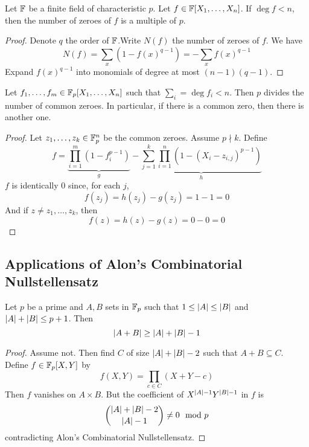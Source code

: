 \documentclass{article}
\begin{document}
\begin{nthm}
  Let $\mathbb F$ be a finite field of characteristic $p$. Let $f \in \mathbb F[X_1, \dots, X_n]$. If $\deg f < n$, then the number of zeroes of $f$ is a multiple of $p$.
\end{nthm}
\begin{proof}
  Denote $q$ the order of $\mathbb F$.Write $N(f)$ the number of zeroes of $f$. We have
  $$N(f) = \sum_x(1 - f(x)^{q - 1}) = - \sum_x f(x)^{q - 1}$$
  Expand $f(x)^{q - 1}$ into monomials of degree at most $(n - 1)(q - 1)$.
\end{proof}

\newlec

\begin{nthm}
  Let $f_1, \dots, f_m \in \mathbb F_p[X_1, \dots, X_n]$ such that $\sum_i = \deg f_i < n$. Then $p$ divides the number of common zeroes. In particular, if there is a common zero, then there is another one.
\end{nthm}
\begin{proof}
  Let $z_1, \dots, z_k \in \mathbb F_p^n$ be the common zeroes. Assume $p \nmid k$. Define
  $$f = \underbrace{\prod_{i = 1}^m (1 - f_i^{p - 1})}_g - \underbrace{\sum_{j = 1}^k \prod_{i = 1}^n (1 - (X_i - z_{i, j})^{p - 1})}_h$$
  $f$ is identically $0$ since, for each $j$,
  $$f(z_j) = h(z_j) - g(z_j) = 1 - 1 = 0$$
  And if $z \ne z_1, \dots, z_k$, then
  $$f(z) = h(z) - g(z) = 0 - 0 = 0$$
\end{proof}

\clearpage

\subsection{Applications of Alon's Combinatorial Nullstellensatz}

\begin{nthm}
  Let $p$ be a prime and $A, B$ sets in $\mathbb F_p$ such that $1 \le \left\lvert A\right\rvert \le \left\lvert B\right\rvert$ and $\left\lvert A\right\rvert + \left\lvert B\right\rvert \le p + 1$. Then
  $$\left\lvert A + B\right\rvert \ge \left\lvert A\right\rvert + \left\lvert B\right\rvert - 1$$
\end{nthm}
\begin{proof}
  Assume not. Then find $C$ of size $\left\lvert A\right\rvert + \left\lvert B\right\rvert - 2$ such that $A + B \subseteq C$. Define $f \in \mathbb F_p[X, Y]$ by
  $$f(X, Y) = \prod_{c \in C}(X + Y - c)$$
  Then $f$ vanishes on $A \times B$. But the coefficient of $X^{\left\lvert A\right\rvert - 1}Y^{\left\lvert B\right\rvert - 1}$ in $f$ is
  $$\binom{\left\lvert A\right\rvert + \left\lvert B\right\rvert - 2}{\left\lvert A\right\rvert - 1} \ne 0 \mod p$$
  contradicting Alon's Combinatorial Nullstellensatz.
\end{proof}
\end{document}
